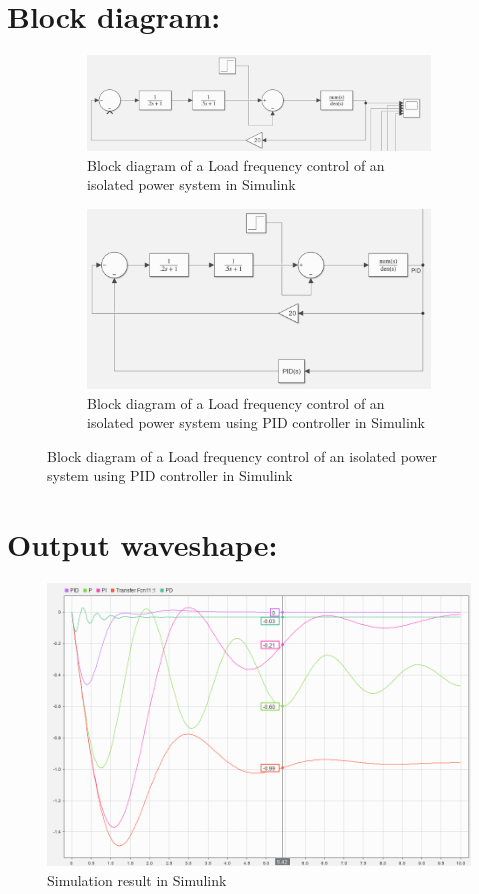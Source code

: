 \documentclass[a4paper,12pt]{article}
\begin{document}
	\section*{Block diagram:}

		\begin{figure}[H]
		\centering
		\begin{subfigure}[t]{1\textwidth}
			\centering
			\includegraphics[width=1\linewidth]{"Images/1"}
		\caption{Block diagram of a Load frequency control of an isolated power system in Simulink}
		\end{subfigure}
		
		\begin{subfigure}[t]{1\textwidth}
			\centering
			\includegraphics[width=1\linewidth]{"Images/2"}
		\caption{Block diagram of a Load frequency control of an isolated power system using PID controller in Simulink }
		\end{subfigure}
		
		
	\end{figure}
	
	
	
	
	\newpage
	\section*{Output waveshape:}
	\begin{figure}[H]
		\centering
		\includegraphics[width=1\linewidth]{"Images/4"}
		\caption{Simulation result in Simulink}
		\label{fig:screenshot-2025-04-26-063416}
	\end{figure}
\end{document}
